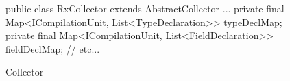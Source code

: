 \begin{figure}[H]
\begin{sourcecode}
\begin{javacode}{}
public class RxCollector extends AbstractCollector {
	...
	private final Map<ICompilationUnit, List<TypeDeclaration>> typeDeclMap;
	private final Map<ICompilationUnit, List<FieldDeclaration>> fieldDeclMap;
	// etc...
}
\end{javacode}
\caption{\toolextension{} Collector}
\label{code:collector}
\end{sourcecode}
\end{figure}